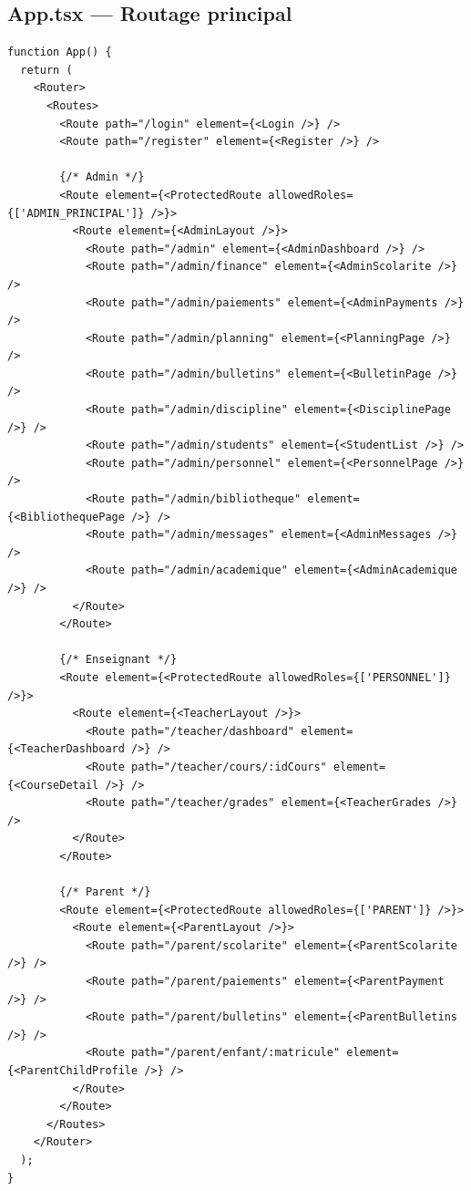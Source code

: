 \documentclass[12pt,a4paper]{article}
\begin{document}
\subsection{App.tsx --- Routage principal}

\begin{lstlisting}[style=code]
function App() {
  return (
    <Router>
      <Routes>
        <Route path="/login" element={<Login />} />
        <Route path="/register" element={<Register />} />

        {/* Admin */}
        <Route element={<ProtectedRoute allowedRoles={['ADMIN_PRINCIPAL']} />}>
          <Route element={<AdminLayout />}>
            <Route path="/admin" element={<AdminDashboard />} />
            <Route path="/admin/finance" element={<AdminScolarite />} />
            <Route path="/admin/paiements" element={<AdminPayments />} />
            <Route path="/admin/planning" element={<PlanningPage />} />
            <Route path="/admin/bulletins" element={<BulletinPage />} />
            <Route path="/admin/discipline" element={<DisciplinePage />} />
            <Route path="/admin/students" element={<StudentList />} />
            <Route path="/admin/personnel" element={<PersonnelPage />} />
            <Route path="/admin/bibliotheque" element={<BibliothequePage />} />
            <Route path="/admin/messages" element={<AdminMessages />} />
            <Route path="/admin/academique" element={<AdminAcademique />} />
          </Route>
        </Route>

        {/* Enseignant */}
        <Route element={<ProtectedRoute allowedRoles={['PERSONNEL']} />}>
          <Route element={<TeacherLayout />}>
            <Route path="/teacher/dashboard" element={<TeacherDashboard />} />
            <Route path="/teacher/cours/:idCours" element={<CourseDetail />} />
            <Route path="/teacher/grades" element={<TeacherGrades />} />
          </Route>
        </Route>

        {/* Parent */}
        <Route element={<ProtectedRoute allowedRoles={['PARENT']} />}>
          <Route element={<ParentLayout />}>
            <Route path="/parent/scolarite" element={<ParentScolarite />} />
            <Route path="/parent/paiements" element={<ParentPayment />} />
            <Route path="/parent/bulletins" element={<ParentBulletins />} />
            <Route path="/parent/enfant/:matricule" element={<ParentChildProfile />} />
          </Route>
        </Route>
      </Routes>
    </Router>
  );
}
\end{lstlisting}
\end{document}
